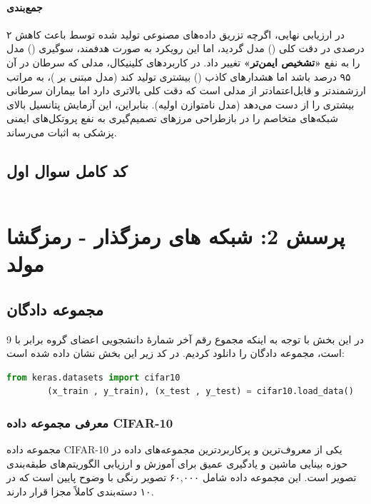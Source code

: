 \documentclass{article}
\begin{document}
\paragraph{جمع‌بندی}
در ارزیابی نهایی، اگرچه تزریق داده‌های مصنوعی تولید شده توسط  باعث کاهش ۲ درصدی در دقت کلی () مدل گردید، اما این رویکرد به صورت هدفمند، سوگیری () مدل را به نفع \textbf{«تشخیص ایمن‌تر»} تغییر داد. در کاربردهای کلینیکال، مدلی که  سرطان در آن ۹۵ درصد باشد اما هشدارهای کاذب () بیشتری تولید کند (مدل مبتنی بر )، به مراتب ارزشمندتر و قابل‌اعتمادتر از مدلی است که دقت کلی بالاتری دارد اما بیماران سرطانی بیشتری را از دست می‌دهد (مدل نامتوازن اولیه). بنابراین، این آزمایش پتانسیل بالای شبکه‌های متخاصم را در بازطراحی مرزهای تصمیم‌گیری به نفع پروتکل‌های ایمنی پزشکی به اثبات می‌رساند.
\newpage
\subsection{ کد کامل سوال اول}
\begin{LTR}
	\inputminted{python}{code/final_cdcgan.py}
\end{LTR}


\section{پرسش 2: شبکه های رمزگذار - رمزگشا مولد}
\subsection{مجموعه دادگان}
در این بخش با توجه به اینکه مجموع رقم آخر شمارۀ دانشجویی اعضای گروه برابر با 9 است، مجموعه دادگان  را دانلود کردیم. در کد زیر این بخش نشان داده شده است:
\begin{latin}
	\begin{lstlisting}[language=Python]
		from keras.datasets import cifar10
		(x_train , y_train), (x_test , y_test) = cifar10.load_data()
	\end{lstlisting}
\end{latin}

\subsubsection{معرفی مجموعه داده CIFAR-10}
مجموعه داده CIFAR-10 یکی از معروف‌ترین و پرکاربردترین مجموعه‌های داده در حوزه بینایی ماشین و یادگیری عمیق برای آموزش و ارزیابی الگوریتم‌های طبقه‌بندی تصویر است. این مجموعه داده شامل ۶۰,۰۰۰ تصویر رنگی با وضوح پایین است که در ۱۰ دسته‌بندی کاملاً مجزا قرار دارند.
\end{document}
